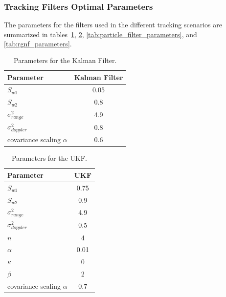 \subsubsection{Tracking Filters Optimal Parameters}
The parameters for the filters used in the different tracking scenarios are summarized in tables~\ref{tab:kalman_parameters}, \ref{tab:ukf_parameters1}, \ref{tab:particle_filter_parameters}, and \ref{tab:rgnf_parameters}.

\begin{table}[H]
    \centering
    \begin{tabular}{l c}
        \toprule
        \textbf{Parameter} & \textbf{Kalman Filter} \\
        \midrule
        \(S_{w1}\) & 0.05 \\
        \(S_{w2}\) & 0.8 \\
        \(\sigma^2_{range}\) & 4.9 \\
        \(\sigma^2_{doppler}\) & 0.8 \\
        covariance scaling \(\alpha\) & 0.6\\
        \bottomrule
    \end{tabular}
    \caption{Parameters for the Kalman Filter.}
    \label{tab:kalman_parameters}
\end{table}

\begin{table}[H]
    \centering
    \begin{tabular}{l c}
        \toprule
        \textbf{Parameter} & \textbf{UKF} \\
        \midrule
        \(S_{w1}\) & 0.75 \\
        \(S_{w2}\) & 0.9 \\
        \(\sigma^2_{range}\) & 4.9 \\
        \(\sigma^2_{doppler}\) & 0.5 \\
        \(n\) & 4 \\
        \(\alpha\) & 0.01 \\
        \(\kappa\) & 0 \\
        \(\beta\) & 2 \\
        covariance scaling \(\alpha\) & 0.7\\
        \bottomrule
    \end{tabular}
    \caption{Parameters for the UKF.}
    \label{tab:ukf_parameters1}
\end{table}

